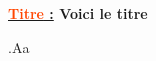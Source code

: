 \documentclass[a4paper, 12pt, twoside]{article}
\renewcommand{\emph}{\textcolor{ff4500}}
\begin{document}
    \setlength{\parskip}{3pt}

    \begin{center}\textbf{{\Large \underline{\emph{Titre} :}} {\large Voici le titre}}\end{center}
 
    \newpage
    .Aa
    
\end{document}
